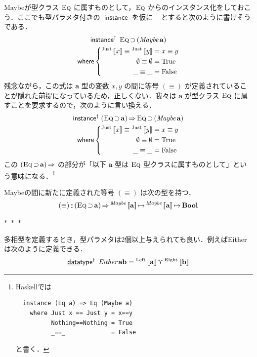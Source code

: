 \documentclass[a4paper,twocolumn]{jsbook}
\def\[{\left[\!\left[}
\def\]{\right]\!\right]}
\newcommand{\separator}{\begin{center}$*$~$*$~$*$\end{center}}
\newcommand{\programminglanguage}[1]{\textsf{#1}}
\newcommand{\haskell}{\programminglanguage{Haskell}}
\newcommand{\mKeyword}[1]{\mathsf{#1}} %
\newcommand{\mKeywordUnderline}[1]{\text{\underline{\textsf{#1}}}} %
\newcommand{\mDataTypeKeyword}{\mKeywordUnderline{data}\mKeyword{type}}
\newcommand{\mInstanceKeyword}{\mKeyword{instance}}
\newcommand{\mWhereKeyword}{\mKeyword{where}}
\DeclareMathOperator{\mDataTypeParametric}{\mDataTypeKeyword^\dagger}
\DeclareMathOperator{\mInstance}{\mInstanceKeyword}
\DeclareMathOperator{\mInstanceParametric}{\mInstanceKeyword^{\dagger}}
\DeclareMathOperator{\mSuperClass}{\Rightarrow}
\DeclareMathOperator{\mSuperSet}{\supset}
\DeclareMathOperator{\mWhere}{\mWhereKeyword}
\newcommand{\mSpecialConstant}[1]{\textrm{#1}} %
\newcommand{\mFalse}{\mSpecialConstant{False}}
\newcommand{\mNothing}{\emptyset}
\newcommand{\mTrue}{\mSpecialConstant{True}}
\newcommand{\mAnyParam}{\_}
\DeclareMathOperator{\mIn}{{:\!:}}
\DeclareMathOperator{\mMapsTo}{\mapsto}
\DeclareMathOperator{\mValueOr}{\curlyvee}
\newcommand{\mSpecialSub}[1]{\text{#1}}
\newcommand{\mLeft}{\mSpecialSub{Left}}
\newcommand{\mRight}{\mSpecialSub{Right}}
\newcommand{\mType}[1]{\mathbf{#1}}
\newcommand{\mBoolType}{\mType{Bool}}
\newcommand{\mTypeConstructor}[1]{\textit{#1}}
\DeclareMathOperator{\mEitherTypeConstructor}{\mTypeConstructor{Either}}
\DeclareMathOperator{\mMaybeTypeConstructor}{\mTypeConstructor{Maybe}}
\newcommand{\mGenericTypeAssemble}[2]{{}^{\mTypeConstructor{#1}}\[\mType{#2}\]}
\newcommand{\mMaybeType}[1]{\mGenericTypeAssemble{Maybe}{#1}}
\newcommand{\mGenericValueConstructor}[1]{\mathrm{#1}}
\newcommand{\mGenericWith}[2]{{}^\mGenericValueConstructor{#1}\[#2\]}
\newcommand{\mLeftWith}[1]{\mGenericWith{\mLeft}{#1}}
\newcommand{\mRightWith}[1]{\mGenericWith{\mRight}{#1}}
\newcommand{\mJustWith}[1]{\mGenericWith{Just}{#1}}
\newcommand{\mGenericTypeClass}[1]{\textsc{#1}} %
\newcommand{\mEqTypeClass}{\mGenericTypeClass{Eq}}
\newcommand{\mProj}[2]{#1\mMapsTo#2}
\begin{document}
Maybeが型クラス $\mEqTypeClass$ に属すものとして，$\mEqTypeClass$ からのインスタンス化をしておこう．ここでも型パラメタ付きの $\mInstance$ を仮に $\mInstanceParametric$ とすると次のように書けそうである．
\begin{multline}
\mInstanceParametric\;
\mEqTypeClass\mSuperSet{}(\mMaybeTypeConstructor\mType{a})\\
\mWhere
\left\{
\begin{aligned}
\mJustWith{x}\equiv\mJustWith{y}&=x\equiv y\\
\mNothing\equiv\mNothing&=\mTrue\\
\mAnyParam\equiv\mAnyParam&=\mFalse
\end{aligned}
\right.
\end{multline}
残念ながら，この式は $\mType{a}$ 型の変数 $x,y$ の間に等号 $(\equiv)$ が定義されていることが隠れた前提になっているため，正しくない．我々は $\mType{a}$ が型クラス $\mEqTypeClass$ に属すことを要求するので，次のように言い換える．
\begin{multline}
\mInstanceParametric\;
(\mEqTypeClass\mSuperSet\mType{a})\mSuperClass
\mEqTypeClass\mSuperSet{}(\mMaybeTypeConstructor\mType{a})\\
\mWhere
\left\{
\begin{aligned}
\mJustWith{x}\equiv\mJustWith{y}&=x\equiv y\\
\mNothing\equiv\mNothing&=\mTrue\\
\mAnyParam\equiv\mAnyParam&=\mFalse
\end{aligned}
\right.
\end{multline}
この $(\mEqTypeClass\mSuperSet\mType{a})\mSuperClass$ の部分が「以下 $\mType{a}$ 型は $\mEqTypeClass$ 型クラスに属すものとして」という意味になる．\footnote{\haskell では
\begin{verbatim}
  instance (Eq a) => Eq (Maybe a)
    where Just x == Just y = x==y
          Nothing==Nothing = True
          _==_             = False
\end{verbatim}
と書く．
}

Maybeの間に新たに定義された等号 $(\equiv)$ は次の型を持つ．
\begin{equation}
(\equiv)\mIn{}(\mEqTypeClass\mSuperSet\mType{a})\mSuperClass\mProj{\mMaybeType{a}}{\mProj{\mMaybeType{a}}{\mBoolType}}
\end{equation}

\separator

多相型を定義するとき，型パラメタは2個以上与えられても良い．例えばEitherは次のように定義できる．
\begin{equation}
\mDataTypeParametric\;\mEitherTypeConstructor\mType{a}\mType{b}
=\mLeftWith{\mType{a}}
\mValueOr
\mRightWith{\mType{b}}
\end{equation}
\end{document}
